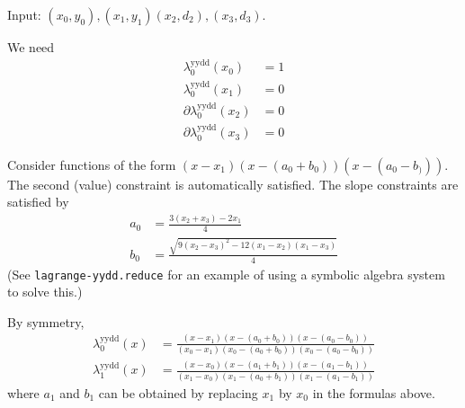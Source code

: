 \label{sec:lagrange-yydd}

Input: $(x_0,y_0), (x_1,y_1)$$(x_2,d_2), (x_3,d_3)$.

We need 
\begin{align}
\lambda^{\text{yydd}}_0(x_0) & = 1 \\ 
\lambda^{\text{yydd}}_0(x_1) & = 0 \nonumber \\
\partial\lambda^{\text{yydd}}_0(x_2) & = 0 \nonumber \\
\partial\lambda^{\text{yydd}}_0(x_3) & = 0 \nonumber 
\end{align}

Consider functions of the form $(x-x_1)(x-(a_0+b_0))(x-(a_0-b_)))$.
The second (value) constraint is automatically satisfied.
The slope constraints are satisfied by
\begin{align}
a_0 & = \frac{3 (x_2 + x_3) - 2 x_1}{4} \\ 
b_0 & = \frac{
\sqrt{ 9 (x_2 - x_3)^2 - 12 (x_1 - x_2) (x_1 -x_3)}
}
{4} \nonumber
\end{align}
(See \texttt{lagrange-yydd.reduce} for an example of using a
symbolic algebra system to solve this.)

By symmetry,  
\begin{align}
\lambda^{\text{yydd}}_0(x) & =
\frac{(x-x_1)(x-(a_0+b_0))(x-(a_0-b_0))}
{(x_0-x_1)(x_0-(a_0+b_0))(x_0-(a_0-b_0))}
\\
\lambda^{\text{yydd}}_1(x) & =
\frac{(x-x_0)(x-(a_1+b_1))(x-(a_1-b_1))}
{(x_1-x_0)(x_1-(a_0+b_1))(x_1-(a_1-b_1))}
\nonumber
\end{align}
where $a_1$ and $b_1$ can be obtained 
by replacing $x_1$ by $x_0$ in the formulas
above.


